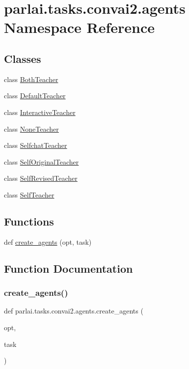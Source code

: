 \hypertarget{namespaceparlai_1_1tasks_1_1convai2_1_1agents}{}\section{parlai.\+tasks.\+convai2.\+agents Namespace Reference}
\label{namespaceparlai_1_1tasks_1_1convai2_1_1agents}
\subsection*{Classes}
\begin{DoxyCompactItemize}
\item 
class \hyperlink{classparlai_1_1tasks_1_1convai2_1_1agents_1_1BothTeacher}{Both\+Teacher}
\item 
class \hyperlink{classparlai_1_1tasks_1_1convai2_1_1agents_1_1DefaultTeacher}{Default\+Teacher}
\item 
class \hyperlink{classparlai_1_1tasks_1_1convai2_1_1agents_1_1InteractiveTeacher}{Interactive\+Teacher}
\item 
class \hyperlink{classparlai_1_1tasks_1_1convai2_1_1agents_1_1NoneTeacher}{None\+Teacher}
\item 
class \hyperlink{classparlai_1_1tasks_1_1convai2_1_1agents_1_1SelfchatTeacher}{Selfchat\+Teacher}
\item 
class \hyperlink{classparlai_1_1tasks_1_1convai2_1_1agents_1_1SelfOriginalTeacher}{Self\+Original\+Teacher}
\item 
class \hyperlink{classparlai_1_1tasks_1_1convai2_1_1agents_1_1SelfRevisedTeacher}{Self\+Revised\+Teacher}
\item 
class \hyperlink{classparlai_1_1tasks_1_1convai2_1_1agents_1_1SelfTeacher}{Self\+Teacher}
\end{DoxyCompactItemize}
\subsection*{Functions}
\begin{DoxyCompactItemize}
\item 
def \hyperlink{namespaceparlai_1_1tasks_1_1convai2_1_1agents_a0c9209b5a7c832ac11a43d91ee7929f0}{create\+\_\+agents} (opt, task)
\end{DoxyCompactItemize}


\subsection{Function Documentation}
\mbox{\label{namespaceparlai_1_1tasks_1_1convai2_1_1agents_a0c9209b5a7c832ac11a43d91ee7929f0}} 
\subsubsection{\texorpdfstring{create\+\_\+agents()}{create\_agents()}}
{\footnotesize\ttfamily def parlai.\+tasks.\+convai2.\+agents.\+create\+\_\+agents (\begin{DoxyParamCaption}\item[{}]{opt,  }\item[{}]{task }\end{DoxyParamCaption})}

